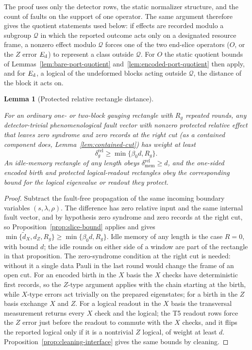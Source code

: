 \documentclass[aps,prx,reprint,superscriptaddress,nofootinbib,floatfix,longbibliography]{revtex4-2}
\newtheorem{lemma}[theorem]{Lemma}
\theoremstyle{definition}
\begin{document}


The proof uses only the detector rows, the static normalizer structure, and
the count of faults on the support of one operator.  The same argument
therefore gives the quotient statements used below: if effects are recorded
modulo a subgroup $\mathcal Q$ in which the reported outcome acts only on a
designated resource frame, a nonzero effect modulo $\mathcal Q$ forces one of
the two end-slice operators ($O$, or the $Z$ error $E_{\rm d}$) to represent a
class outside $\mathcal Q$.  For $O$ the static quotient bounds of
Lemmas~\ref{lem:bare-port-quotient} and~\ref{lem:encoded-port-quotient} then
apply, and for $E_{\rm d}$, a logical of the undeformed blocks acting outside
$\mathcal Q$, the distance of the block it acts on.

\begin{lemma}[Protected relative rectangle distance]\label{lem:relative-rectangle-distance}

For an ordinary one- or two-block gauging rectangle with $R_g$ repeated
rounds, any detector-trivial phenomenological fault vector with nonzero
protected relative effect that leaves zero syndrome and zero records at the
right cut (as a contained component does, Lemma~\ref{lem:contained-cut}) has
weight at least
\begin{equation}
 \delta_g^{\mathrm{rel}}\geq\min\{\beta_0d,R_g\}.                     \tag{A15d}
\end{equation}
An idle-memory rectangle of any length obeys
$\delta_{\mathrm{mem}}^{\mathrm{rel}}\geq d$, and the
one-sided encoded birth and protected logical-readout rectangles obey the
corresponding bound for the logical eigenvalue or readout they protect.
\end{lemma}
\begin{proof}
Subtract the fault-free propagation of the same incoming boundary variables
$(s,\lambda,\rho)$.  The difference has zero relative input and the same
internal fault vector, and by hypothesis zero syndrome and zero records at
the right cut, so Proposition~\ref{prop:slice-bound} applies and gives
$\min\{\widetilde d_X,d_Z,R_g\}\geq\min\{\beta_0d,R_g\}$.  Idle memory of any
length is the case $R=0$, with bound $d$; the idle rounds on either side of a
window are part of the rectangle in that proposition.  The zero-syndrome
condition at the right cut is needed: without it a single data Pauli in the
last round would change the frame of an open cut.  For an encoded birth in
the $X$ basis the $X$ checks have deterministic first records, so the
$Z$-type argument applies with the chain starting at the birth, while
$X$-type errors act trivially on the prepared eigenstates; for a birth in the
$Z$ basis exchange $X$ and $Z$.  For a logical readout in the $X$ basis the
transversal measurement returns every $X$ check and the logical; the T5
readout rows force the $Z$ error just before the readout to commute with the
$X$ checks, and it flips the reported logical only if it is a nontrivial $Z$
logical, of weight at least $d$.  Proposition~\ref{prop:cleaning-interface}
gives the same bounds by cleaning.
\end{proof}
\end{document}
